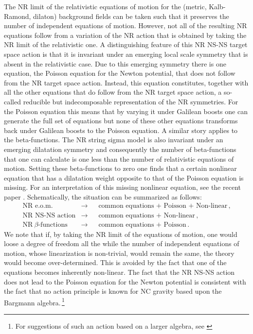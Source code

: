 \documentclass[a4paper,10pt,openany]{article}
\begin{document}
	The NR limit of the relativistic equations of motion for the (metric, Kalb-Ramond, dilaton) background fields can be taken such that it preserves the number of independent equations of motion. However, not all of the resulting NR equations follow from a variation of the NR action that is obtained by taking the NR limit of the relativistic one. A distinguishing feature of this NR NS-NS target space action  is that it is invariant under an emerging local scale symmetry that is absent in the relativistic case. Due to this emerging symmetry there is one equation, the Poisson equation for the Newton potential, that does not follow from the NR target space action. Instead, this equation constitutes, together with all the other equations that do follow from the NR target space action, a so-called reducible but indecomposable representation of the NR symmetries. For the Poisson equation this means  that by varying it  under Galilean boosts one can generate the full set of equations but none of these other equations transforms back under Galilean boosts to the Poisson equation. A similar story applies to the beta-functions. The NR string sigma model is also invariant under an emerging dilatation symmetry and consequently the number of beta-functions that one can calculate is one less than the number of relativistic equations of motion.  Setting these beta-functions to zero one finds that a certain nonlinear equation that has a dilatation weight opposite to that of the Poisson equation is missing. For an interpretation of this missing nonlinear equation, see the recent paper \cite{Yan:2021lbe}. Schematically, the situation can be summarized as follows:
	\begin{eqnarray}
		\textrm{NR e.o.m.} &\rightarrow &\ \ \textrm{ common equations \ + Poisson\ +\ Non-linear}\,,\\[.1truecm]
		\textrm{NR NS-NS action} &\rightarrow &\ \ \textrm{ common equations \ +\ Non-linear}\,,\\[.1truecm]
		\textrm{NR}\ \beta\textrm{-functions} &\rightarrow &\ \ \textrm{ common equations \ + Poisson}\,.
	\end{eqnarray}
	We note that if, by taking the NR limit of the equations of motion, one would loose a degree of freedom all the while the number of independent equations of motion, whose linearization is non-trivial, would remain the same, the theory would become over-determined. This is avoided by the fact that one of the equations becomes inherently non-linear. The fact that the NR NS-NS action does not lead to the Poisson equation for the Newton potential is consistent with the fact that no action principle is known for NC gravity based upon the Bargmann algebra.\,\footnote{For suggestions of such an action based on a larger algebra, see \cite{Hansen:2019pkl}}
	
\end{document}

